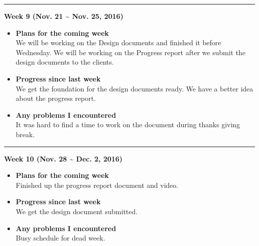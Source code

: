 		\rule{\textwidth}{0.5pt}

		\begin{center}
			\textbf{Week 9 (Nov. 21 {\textasciitilde{}} Nov. 25, 2016)}
		\end{center}
		\begin{itemize}
			\item \textbf{Plans for the coming week}
			\\ We will be working on the Design documents and finished it before Wednesday. We will be working on the Progress report after we submit the design documents to the clients. \\

			\item \textbf{Progress since last week}
			\\ We get the foundation for the design documents ready. We have a better idea about the progress report. \\

			\item \textbf{Any problems I encountered}
			\\It was hard to find a time to work on the document during thanks giving break.\\
		\end{itemize}

		\rule{\textwidth}{0.5pt}

		\begin{center}
			\textbf{Week 10 (Nov. 28 {\textasciitilde{}} Dec. 2, 2016)}
		\end{center}
		\begin{itemize}
			\item \textbf{Plans for the coming week}
			\\Finished up the progress report document and video. \\

			\item \textbf{Progress since last week}
			\\We get the design document submitted. \\

			\item \textbf{Any problems I encountered}
			\\Busy schedule for dead week.\\
		\end{itemize}








